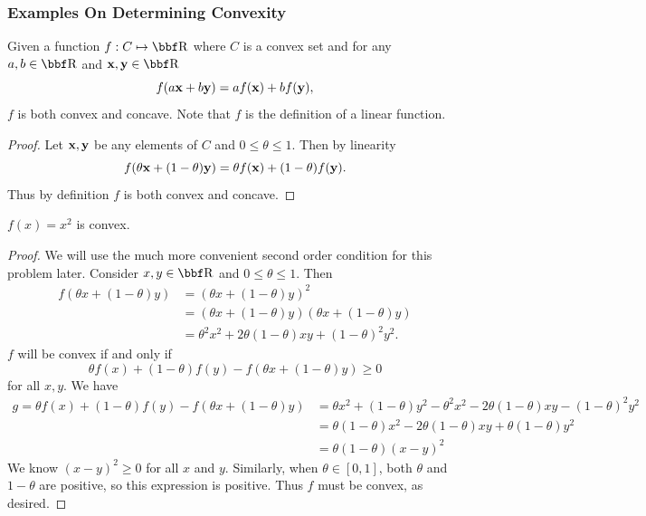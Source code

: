 \documentclass{article}
\begin{document}
\subsubsection{Examples On Determining Convexity}

\begin{theorem}
    Given a function $f : C \mapsto \RR$ where $C$ is a convex
    set and for any $a,b\in\RR$ and $\xx,\yy\in\RR$
    \[
        f(a{\bf x} + b{\bf y}) = af({\bf x}) + bf({\bf y}),
    \]
    $f$ is both convex and concave. Note that $f$ is the definition
    of a linear function.
\end{theorem}
\begin{proof}
    Let ${\bf x},{\bf y}$ be any elements of $C$ and $0\leq\theta\leq1$. Then
    by linearity
    \[
        f(\theta{\bf x} + (1-\theta){\bf y}) = \theta f({\bf x}) + (1-\theta)f({\bf y}).
    \]
    Thus by definition $f$ is both convex and concave.
\end{proof}

\begin{example}
    $f(x) = x^2$ is convex.
\end{example}
\begin{proof}
    We will use the much more convenient second order condition
    for this problem later. Consider $x,y\in\RR$ and $0\leq\theta\leq1$.
    Then
    \begin{align*}
        f(\theta x + (1-\theta)y) &= (\theta x + (1-\theta)y)^2\\
        &= (\theta x + (1-\theta)y)(\theta x + (1-\theta)y)\\
        &= \theta^2x^2 + 2\theta(1-\theta)xy + (1-\theta)^2y^2.
    \end{align*}
    $f$ will be convex if and only if
    \[
        \theta f(x) + (1-\theta)f(y) - f(\theta x + (1-\theta)y) \geq 0
    \]
    for all $x,y$. We have
    \begin{align*}
        g = \theta f(x) + (1-\theta)f(y) - f(\theta x + (1-\theta)y) &= \theta x^2 + (1-\theta)y^2 - \theta^2x^2 - 2\theta(1-\theta)xy - (1-\theta)^2y^2\\
        &= \theta(1-\theta)x^2 - 2\theta(1-\theta)xy + \theta(1-\theta)y^2\\
        &= \theta(1-\theta)(x-y)^2
    \end{align*}
    We know $(x-y)^2 \geq 0$ for all $x$ and $y$. Similarly, when
    $\theta \in [0,1]$, both $\theta$ and $1-\theta$ are positive,
    so this expression is positive. Thus $f$ must be convex, as desired.
\end{proof}
\end{document}
